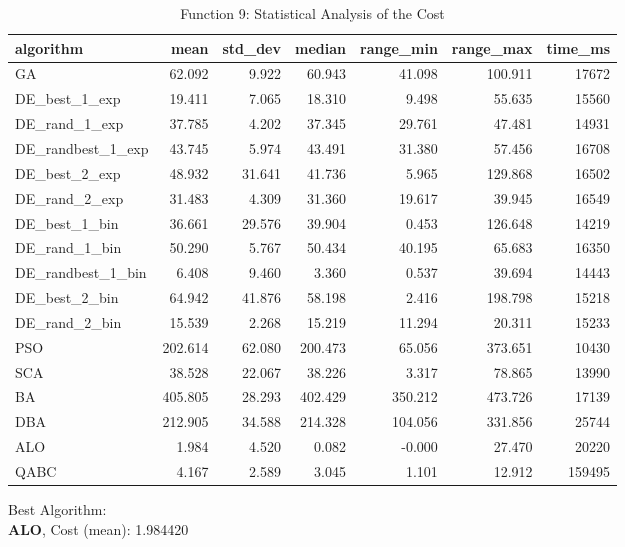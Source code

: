 \documentclass[12pt]{article}
\begin{document}
\begin{table}[H]
    \centering
    \footnotesize
    \begin{adjustbox}{width=1\textwidth}
\begin{tabular}{lrrrrrr}
\toprule
         algorithm &    mean &  std\_dev &  median &  range\_min &  range\_max &  time\_ms \\
\midrule
                GA &  62.092 &    9.922 &  60.943 &     41.098 &    100.911 &    17672 \\
     DE\_best\_1\_exp &  19.411 &    7.065 &  18.310 &      9.498 &     55.635 &    15560 \\
     DE\_rand\_1\_exp &  37.785 &    4.202 &  37.345 &     29.761 &     47.481 &    14931 \\
 DE\_randbest\_1\_exp &  43.745 &    5.974 &  43.491 &     31.380 &     57.456 &    16708 \\
     DE\_best\_2\_exp &  48.932 &   31.641 &  41.736 &      5.965 &    129.868 &    16502 \\
     DE\_rand\_2\_exp &  31.483 &    4.309 &  31.360 &     19.617 &     39.945 &    16549 \\
     DE\_best\_1\_bin &  36.661 &   29.576 &  39.904 &      0.453 &    126.648 &    14219 \\
     DE\_rand\_1\_bin &  50.290 &    5.767 &  50.434 &     40.195 &     65.683 &    16350 \\
 DE\_randbest\_1\_bin &   6.408 &    9.460 &   3.360 &      0.537 &     39.694 &    14443 \\
     DE\_best\_2\_bin &  64.942 &   41.876 &  58.198 &      2.416 &    198.798 &    15218 \\
     DE\_rand\_2\_bin &  15.539 &    2.268 &  15.219 &     11.294 &     20.311 &    15233 \\
               PSO & 202.614 &   62.080 & 200.473 &     65.056 &    373.651 &    10430 \\
               SCA &  38.528 &   22.067 &  38.226 &      3.317 &     78.865 &    13990 \\
                BA & 405.805 &   28.293 & 402.429 &    350.212 &    473.726 &    17139 \\
               DBA & 212.905 &   34.588 & 214.328 &    104.056 &    331.856 &    25744 \\
               ALO &   1.984 &    4.520 &   0.082 &     -0.000 &     27.470 &    20220 \\
              QABC &   4.167 &    2.589 &   3.045 &      1.101 &     12.912 &   159495 \\
\bottomrule
\end{tabular}


    \end{adjustbox}
    \caption{Function 9: Statistical Analysis of the Cost} 
    \end{table}
Best Algorithm: \\
\textbf{ALO}, Cost (mean): 1.984420\\
\newpage
\end{document}
